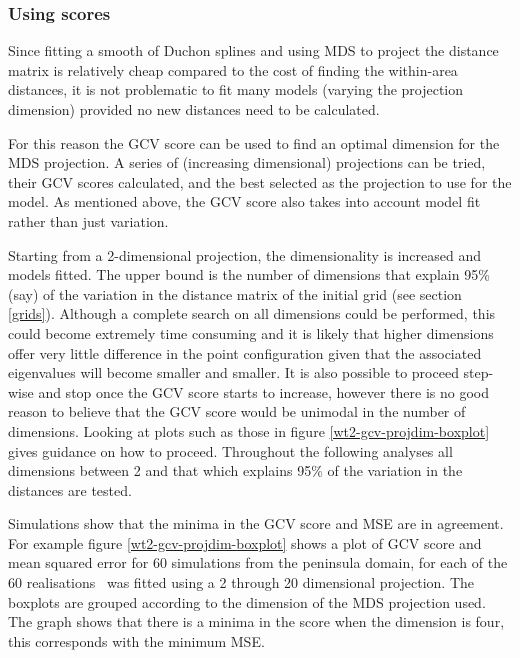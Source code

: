 \subsubsection{Using scores}

Since fitting a smooth of Duchon splines and using MDS to project the distance matrix is relatively cheap compared to the cost of finding the within-area distances, it is not problematic to fit many models (varying the projection dimension) provided no new distances need to be calculated. 

For this reason the GCV score can be used to find an optimal dimension for the MDS projection. A series of (increasing dimensional) projections can be tried, their GCV scores calculated, and the best selected as the projection to use for the model. As mentioned above, the GCV score also takes into account model fit rather than just variation.

Starting from a 2-dimensional projection, the dimensionality is increased and models fitted. The upper bound is the number of dimensions that explain 95\% (say) of the variation in the distance matrix of the initial grid (see section \ref{grids}). Although a complete search on all dimensions could be performed, this could become extremely time consuming and it is likely that higher dimensions offer very little difference in the point configuration given that the associated eigenvalues will become smaller and smaller. It is also possible to proceed step-wise and stop once the GCV score starts to increase, however there is no good reason to believe that the GCV score would be unimodal in the number of dimensions. Looking at plots such as those in figure \ref{wt2-gcv-projdim-boxplot} gives guidance on how to proceed. Throughout the following analyses all dimensions between 2 and that which explains 95\% of the variation in the distances are tested.

Simulations show that the minima in the GCV score and MSE are in agreement. For example figure \ref{wt2-gcv-projdim-boxplot} shows a plot of GCV score and mean squared error for 60 simulations from the peninsula domain, for each of the 60 realisations \mdsds\ was fitted using a 2 through 20 dimensional projection. The boxplots are grouped according to the dimension of the MDS projection used. The graph shows that there is a minima in the score when the dimension is four, this corresponds with the minimum MSE.

